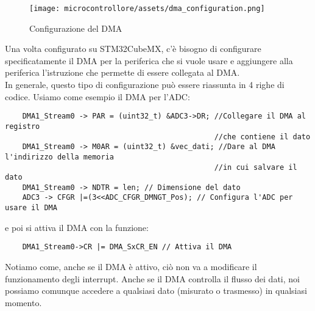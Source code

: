 \begin{wrapfigure}{r}{0.4\linewidth}
    \centering
    \texttt{[image: microcontrollore/assets/dma\_configuration.png]}
    \caption{Configurazione del DMA}
    \label{fig:DMA}
\end{wrapfigure}

Una volta configurato su STM32CubeMX, c'è bisogno di configurare specificatamente il DMA per la periferica che si vuole usare e aggiungere alla periferica l'istruzione che permette di essere collegata al DMA.\\

In generale, questo tipo di configurazione può essere riassunta in 4 righe di codice. Usiamo come esempio il DMA per l'ADC:

\begin{verbatim}
    DMA1_Stream0 -> PAR = (uint32_t) &ADC3->DR; //Collegare il DMA al registro
                                                //che contiene il dato
    DMA1_Stream0 -> M0AR = (uint32_t) &vec_dati; //Dare al DMA l'indirizzo della memoria
                                                //in cui salvare il dato
    DMA1_Stream0 -> NDTR = len; // Dimensione del dato
    ADC3 -> CFGR |=(3<<ADC_CFGR_DMNGT_Pos); // Configura l'ADC per usare il DMA
\end{verbatim}

e poi si attiva il DMA con la funzione:

\begin{verbatim}
    DMA1_Stream0->CR |= DMA_SxCR_EN // Attiva il DMA
\end{verbatim}

\begin{flushleft}

    \colorbox{notebox}{
    \begin{minipage}[]{\textwidth}
        Notiamo come, anche se il DMA è attivo, ciò non va a modificare il funzionamento degli interrupt. Anche se il DMA controlla il flusso dei dati, noi possiamo comunque accedere a qualsiasi dato (misurato o trasmesso) in qualsiasi momento.
    \end{minipage}
    }
\end{flushleft}